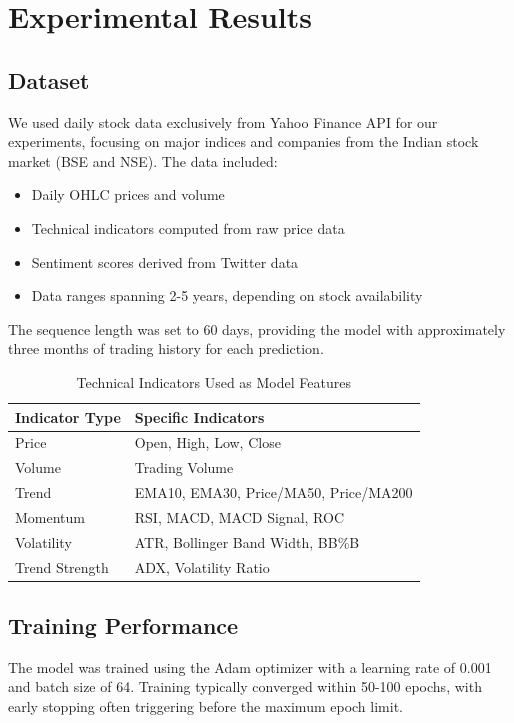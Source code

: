 \documentclass[conference]{IEEEtran}
\begin{document}
\section{Experimental Results}

\subsection{Dataset}

We used daily stock data exclusively from Yahoo Finance API for our experiments, focusing on major indices and companies from the Indian stock market (BSE and NSE). The data included:

\begin{itemize}
\item Daily OHLC prices and volume
\item Technical indicators computed from raw price data
\item Sentiment scores derived from Twitter data
\item Data ranges spanning 2-5 years, depending on stock availability
\end{itemize}

The sequence length was set to 60 days, providing the model with approximately three months of trading history for each prediction.

\begin{table}[h]
\caption{Technical Indicators Used as Model Features}
\centering
\begin{tabular}{ll}
\toprule
\textbf{Indicator Type} & \textbf{Specific Indicators} \\
\midrule
Price & Open, High, Low, Close \\
Volume & Trading Volume \\
Trend & EMA10, EMA30, Price/MA50, Price/MA200 \\
Momentum & RSI, MACD, MACD Signal, ROC \\
Volatility & ATR, Bollinger Band Width, BB\%B \\
Trend Strength & ADX, Volatility Ratio \\
\bottomrule
\end{tabular}
\label{tab:indicators}
\end{table}

\subsection{Training Performance}

The model was trained using the Adam optimizer with a learning rate of 0.001 and batch size of 64. Training typically converged within 50-100 epochs, with early stopping often triggering before the maximum epoch limit.
\end{document}

